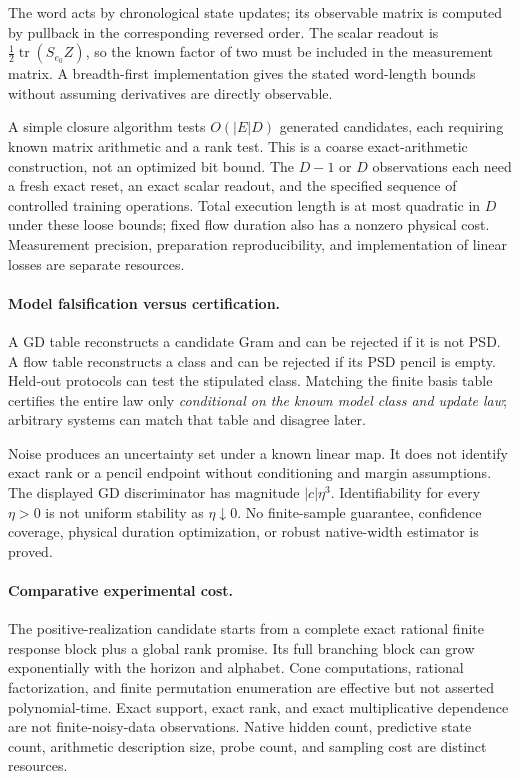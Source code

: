 \documentclass[11pt]{article}
\theoremstyle{remark}
\newcommand{\tr}{\operatorname{tr}}
\begin{document}
The word acts by chronological state updates; its observable matrix is computed by pullback in the corresponding reversed order. The scalar readout is $\frac12\tr(S_{e_0}Z)$, so the known factor of two must be included in the measurement matrix. A breadth-first implementation gives the stated word-length bounds without assuming derivatives are directly observable.

A simple closure algorithm tests $O(|E|D)$ generated candidates, each requiring known matrix arithmetic and a rank test. This is a coarse exact-arithmetic construction, not an optimized bit bound. The $D-1$ or $D$ observations each need a fresh exact reset, an exact scalar readout, and the specified sequence of controlled training operations. Total execution length is at most quadratic in $D$ under these loose bounds; fixed flow duration also has a nonzero physical cost. Measurement precision, preparation reproducibility, and implementation of linear losses are separate resources.

\paragraph{Model falsification versus certification.}
A GD table reconstructs a candidate Gram and can be rejected if it is not PSD. A flow table reconstructs a class and can be rejected if its PSD pencil is empty. Held-out protocols can test the stipulated class. Matching the finite basis table certifies the entire law only \emph{conditional on the known model class and update law}; arbitrary systems can match that table and disagree later.

Noise produces an uncertainty set under a known linear map. It does not identify exact rank or a pencil endpoint without conditioning and margin assumptions. The displayed GD discriminator has magnitude $|c|\eta^3$. Identifiability for every $\eta>0$ is not uniform stability as $\eta\downarrow0$. No finite-sample guarantee, confidence coverage, physical duration optimization, or robust native-width estimator is proved.

\paragraph{Comparative experimental cost.}
The positive-realization candidate starts from a complete exact rational finite response block plus a global rank promise. Its full branching block can grow exponentially with the horizon and alphabet. Cone computations, rational factorization, and finite permutation enumeration are effective but not asserted polynomial-time. Exact support, exact rank, and exact multiplicative dependence are not finite-noisy-data observations. Native hidden count, predictive state count, arithmetic description size, probe count, and sampling cost are distinct resources.
\end{document}
